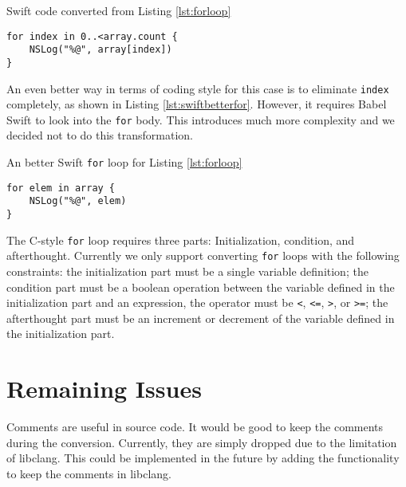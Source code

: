 \documentclass{sfuthesis}
\begin{document}
\begin{listing}[H]
\caption{Swift code converted from Listing \ref{lst:forloop}}
\begin{verbatim}
for index in 0..<array.count {
    NSLog("%@", array[index])
}
\end{verbatim}
\end{listing}

An even better way in terms of coding style for this case is to eliminate \texttt{index} completely, as shown in Listing \ref{lst:swiftbetterfor}. However, it requires Babel Swift to look into the \texttt{for} body. This introduces much more complexity and we decided not to do this transformation.

\begin{listing}[H]
\caption{An better Swift \texttt{for} loop for Listing \ref{lst:forloop}}
\label{lst:swiftbetterfor}
\begin{verbatim}
for elem in array {
    NSLog("%@", elem)
}
\end{verbatim}
\end{listing}

The C-style \texttt{for} loop requires three parts: Initialization, condition, and afterthought. Currently we only support converting \texttt{for} loops with the following constraints: the initialization part must be a single variable definition; the condition part must be a boolean operation between the variable defined in the initialization part and an expression, the operator must be \texttt{<}, \texttt{<=}, \texttt{>}, or \texttt{>=}; the afterthought part must be an increment or decrement of the variable defined in the initialization part.

%
%
%

\section{Remaining Issues}


Comments are useful in source code. It would be good to keep the comments during the conversion. Currently, they are simply dropped due to the limitation of libclang. This could be implemented in the future by adding the functionality to keep the comments in libclang.
\end{document}
